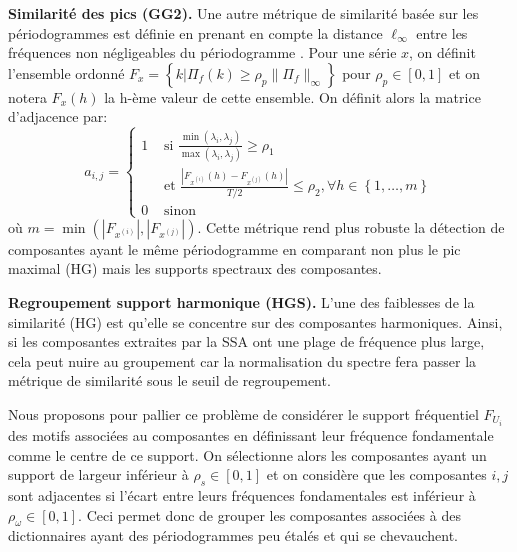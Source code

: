 \documentclass{gretsi}
\newcommand{\set}[1]{\left \{ 1, \dots, #1 \right \}}
\newcommand{\inter}{\left[0, 1\right]}
\begin{document}
\noindent\textbf{Similarité des pics (GG2).}\label{par:GG2}
    Une autre métrique de similarité basée sur les périodogrammes est définie en prenant en compte la distance $\ell_\infty$ entre les fréquences non négligeables du périodogramme \cite{abalov_14_auto}.
    Pour une série $x$, on définit l'ensemble ordonné $F_x = \left \{ k | \Pi_f(k) \ge \rho_p \|\Pi_f\|_\infty \right \}$ pour $\rho_p \in \inter$ et on notera $F_x(h)$ la h-ème valeur de cette ensemble.
    On définit alors la matrice d'adjacence par:
    \begin{equation}
        a_{i, j} = 
        \begin{cases}
	        1 & \text{ si } \displaystyle\frac{\min(\lambda_i, \lambda_j)}{\max(\lambda_i, \lambda_j)} \ge \rho_1\\
	          & \text{ et } \frac{|F_{x^{(i)}}(h) - F_{x^{(j)}}(h)|}{T/2} \le \rho_2, \forall h \in \set{m}\\
	        0 & \text{ sinon}
        \end{cases}
    \end{equation} 
    où $m = \min\left(\left|F_{x^{(i)}}\right|, \left|F_{x^{(j)}}\right|\right)$.
    Cette métrique rend plus robuste la détection de composantes ayant le même périodogramme en comparant non plus le pic maximal (HG) mais les supports spectraux des composantes. 


\noindent\textbf{Regroupement support harmonique (HGS).}\label{par:HGS}
    L'une des faiblesses de la similarité (HG) est qu'elle se concentre sur des composantes harmoniques. 
    Ainsi, si les composantes extraites par la SSA ont une plage de fréquence plus large, cela peut nuire au groupement car la normalisation du spectre fera passer la métrique de similarité sous le seuil de regroupement.

    Nous proposons pour pallier ce problème de considérer le support fréquentiel $F_{U_i}$ des motifs associées au composantes en définissant leur fréquence fondamentale comme le centre de ce support.
    On sélectionne alors les composantes ayant un support de largeur inférieur à $\rho_s \in \inter$ et on considère que les composantes $i, j$ sont adjacentes si l'écart entre leurs fréquences fondamentales est inférieur à $\rho_\omega \in \inter$.
    Ceci permet donc de grouper les composantes associées à des dictionnaires ayant des périodogrammes peu étalés et qui se chevauchent.
\end{document}
